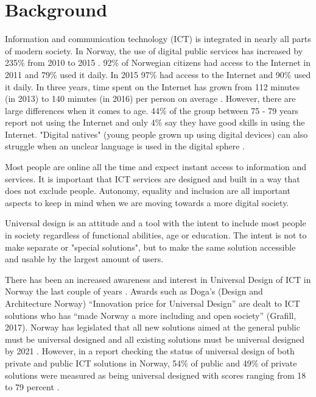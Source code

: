 \section{Background}

Information and communication technology (ICT) is integrated in nearly all parts of modern society. In Norway, the use of digital public services has increased by 235\% from 2010 to 2015 \parencite{Moderniseringsdepartementet2016}. 92\% of Norwegian citizens had access to the Internet in 2011 and 79\% used it daily. In 2015 97\% had access to the Internet and 90\% used it daily. In three years, time spent on the Internet has grown from 112 minutes (in 2013) to 140 minutes (in 2016) per person on average \parencite{ssb_tid_2017}. However, there are large differences when it comes to age. 44\% of the group between 75 - 79 years report not using the Internet and only 4\% say they have good skills in using the Internet. "Digital natives" (young people grown up using digital devices) can also struggle when an unclear language is used in the digital sphere \parencite[40]{Moderniseringsdepartementet2016}.



Most people are online all the time and expect instant access to information and services. It is important that ICT services are designed and built in a way that does not exclude people. Autonomy, equality and inclusion are all important aspects to keep in mind when we are moving towards a more digital society.

Universal design is an attitude and a tool with the intent to include most people in society regardless of functional abilities, age or education. The intent is not to make separate or "special solutions", but to make the same solution accessible and usable by the largest amount of users. 

There has been an increased awareness and interest in Universal Design of ICT in Norway the last couple of years \parencite{begnum_universal_2017}. Awards such as Doga’s (Design and Architecture Norway) “Innovation price for Universal Design” are dealt to ICT solutions who has “made Norway a more including and open society” (Grafill, 2017). Norway has legislated that all new solutions aimed at the general public must be universal designed and all existing solutions must be universal designed by 2021 \parencite{ministry_of_children_and_equality_act_2018}. However, in a report checking the status of universal design of both private and public ICT solutions in Norway, 54\% of public and 49\% of private solutions were measured as being universal designed with scores ranging from 18 to 79 percent \parencite{difi_digitale_2015}.


